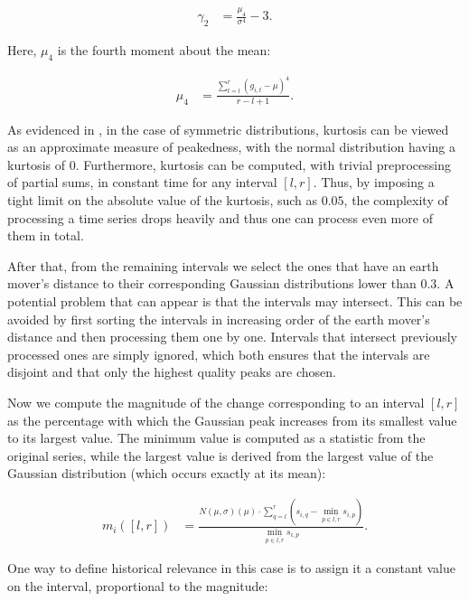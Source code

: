 \begin{align}
\label{eq:kurtosis}
\gamma_2 &= \frac{\mu_4}{\sigma^4} - 3.
\end{align}

Here, $\mu_4$ is the fourth moment about the mean:

\begin{align}
\label{eq:4th-moment}
\mu_4 &= \frac{\sum_{t=l}^{r} \left( g_{i, t} - \mu \right)^4}{r - l + 1}.
\end{align}

As evidenced in \cite{balanda88kurtosis}, in the case of symmetric distributions, kurtosis can be viewed as an approximate measure of peakedness, with the normal distribution having a kurtosis of 0. Furthermore, kurtosis can be computed, with trivial preprocessing of partial sums, in constant time for any interval $\left[ l, r \right]$. Thus, by imposing a tight limit on the absolute value of the kurtosis, such as $0.05$, the complexity of processing a time series drops heavily and thus one can process even more of them in total.

After that, from the remaining intervals we select the ones that have an earth mover's distance to their corresponding Gaussian distributions lower than $0.3$. A potential problem that can appear is that the intervals may intersect. This can be avoided by first sorting the intervals in increasing order of the earth mover's distance and then processing them one by one. Intervals that intersect previously processed ones are simply ignored, which both ensures that the intervals are disjoint and that only the highest quality peaks are chosen.

Now we compute the magnitude of the change corresponding to an interval $\left[ l, r \right]$ as the percentage with which the Gaussian peak increases from its smallest value to its largest value. The minimum value is computed as a statistic from the original series, while the largest value is derived from the largest value of the Gaussian distribution (which occurs exactly at its mean):

\begin{align}
\label{eq:gaussian-magnitude}
m_i \left( \left[ l, r \right] \right) &= \frac{N \left( \mu, \sigma \right) \left( \mu \right) \cdot \sum_{q = l}^{r} \left( s_{i, q} - \min_{p \in \overline{l, r}} s_{i, p} \right)}{\min_{p \in \overline{l, r}} s_{i, p}}.
\end{align}

One way to define historical relevance in this case is to assign it a constant value on the interval, proportional to the magnitude:

